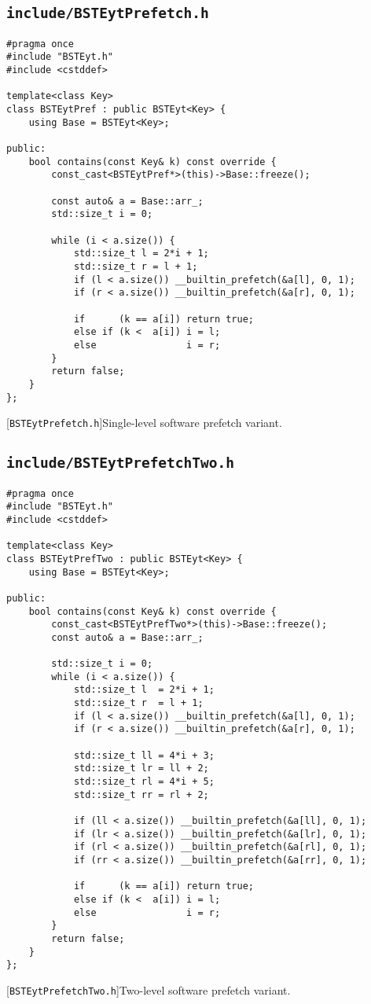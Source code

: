 \subsection{\texttt{include/BSTEytPrefetch.h}}
\label{secsec:bsteyt-pref-h}
\begin{lstlisting}
#pragma once
#include "BSTEyt.h"
#include <cstddef>

template<class Key>
class BSTEytPref : public BSTEyt<Key> {
    using Base = BSTEyt<Key>;

public:
    bool contains(const Key& k) const override {
        const_cast<BSTEytPref*>(this)->Base::freeze();

        const auto& a = Base::arr_;   
        std::size_t i = 0;

        while (i < a.size()) {
            std::size_t l = 2*i + 1;
            std::size_t r = l + 1;
            if (l < a.size()) __builtin_prefetch(&a[l], 0, 1);
            if (r < a.size()) __builtin_prefetch(&a[r], 0, 1);

            if      (k == a[i]) return true;
            else if (k <  a[i]) i = l;
            else                i = r;
        }
        return false;
    }
};
\end{lstlisting}
[\texttt{BSTEytPrefetch.h}]{Single-level software
prefetch variant.}
\label{lst:bsteyt-pref-h}



\subsection{\texttt{include/BSTEytPrefetchTwo.h}}
\label{secsec:bsteyt-pref-two-h}
\begin{lstlisting}
#pragma once
#include "BSTEyt.h"
#include <cstddef>

template<class Key>
class BSTEytPrefTwo : public BSTEyt<Key> {
    using Base = BSTEyt<Key>;

public:
    bool contains(const Key& k) const override {
        const_cast<BSTEytPrefTwo*>(this)->Base::freeze();
        const auto& a = Base::arr_;

        std::size_t i = 0;
        while (i < a.size()) {
            std::size_t l  = 2*i + 1;
            std::size_t r  = l + 1;
            if (l < a.size()) __builtin_prefetch(&a[l], 0, 1);
            if (r < a.size()) __builtin_prefetch(&a[r], 0, 1);

            std::size_t ll = 4*i + 3;   
            std::size_t lr = ll + 2;    
            std::size_t rl = 4*i + 5;   
            std::size_t rr = rl + 2;    

            if (ll < a.size()) __builtin_prefetch(&a[ll], 0, 1);
            if (lr < a.size()) __builtin_prefetch(&a[lr], 0, 1);
            if (rl < a.size()) __builtin_prefetch(&a[rl], 0, 1);
            if (rr < a.size()) __builtin_prefetch(&a[rr], 0, 1);

            if      (k == a[i]) return true;
            else if (k <  a[i]) i = l;
            else                i = r;
        }
        return false;
    }
};
\end{lstlisting}
[\texttt{BSTEytPrefetchTwo.h}]{Two-level software
prefetch variant.}
\label{lst:bsteyt-pref-two-h}


